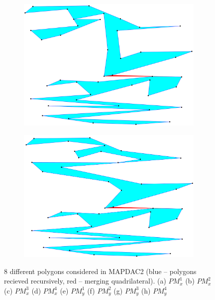 \documentclass[conference]{IEEEtran}
\begin{document}
\begin{figure}[htbp]
				\begin{subfigure}{0.45\linewidth}
					\centering
					\includegraphics[width=0.99\textwidth]{fig1g.png}
					\caption{}
					\label{fig1g}
				\end{subfigure}
				\begin{subfigure}{0.45\linewidth}
					\centering
					\includegraphics[width=0.99\textwidth]{fig1h.png}
					\caption{}
					\label{fig1h}
				\end{subfigure}
				
				\caption
				{
					8 different polygons considered in MAP{\textunderscore}DAC2 (blue -- polygons recieved recursively, red -- merging quadrilateral).
					(a) $PM_{x}^{1}$
					(b) $PM_{x}^{2}$
					(c) $PM_{x}^{3}$
					(d) $PM_{x}^{4}$
					(e) $PM_{y}^{1}$
					(f) $PM_{y}^{2}$
					(g) $PM_{y}^{3}$
					(h) $PM_{y}^{4}$
				}
				\label{fig1}
			\end{figure}
		
\end{document}
